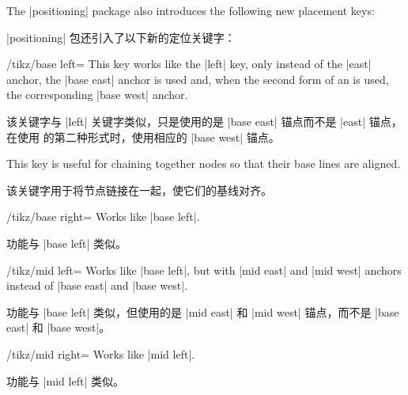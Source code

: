 The |positioning| package also introduces the following new placement keys:

|positioning| 包还引入了以下新的定位关键字：

\begin{key}{/tikz/base left=}
    This key works like the |left| key, only instead of the |east| anchor, the
    |base east| anchor is used and, when the second form of an 
    is used, the corresponding |base west| anchor.

    该关键字与 |left| 关键字类似，只是使用的是 |base east| 锚点而不是 |east| 锚点，在使用  的第二种形式时，使用相应的 |base west| 锚点。

    This key is useful for chaining together nodes so that their base lines are
    aligned.
    
    该关键字用于将节点链接在一起，使它们的基线对齐。
\begin{codeexample}[preamble={\usetikzlibrary{positioning}}]
\end{codeexample}
\end{key}

\begin{key}{/tikz/base right=}
    Works like |base left|.

    功能与 |base left| 类似。

\end{key}
\begin{key}{/tikz/mid left=}
    Works like |base left|, but with |mid east| and |mid west| anchors instead
    of |base east| and |base west|.

    功能与 |base left| 类似，但使用的是 |mid east| 和 |mid west| 锚点，而不是 |base east| 和 |base west|。
\end{key}

\begin{key}{/tikz/mid right=}
    Works like |mid left|.

    功能与 |mid left| 类似。
\end{key}


